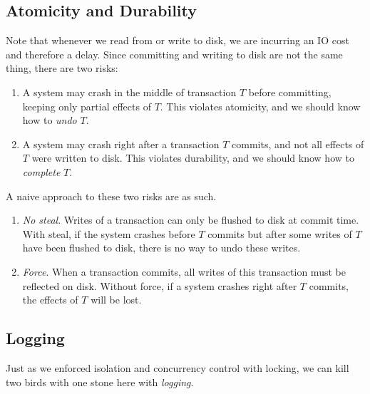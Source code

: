 \subsection{Atomicity and Durability} 

    Note that whenever we read from or write to disk, we are incurring an IO cost and therefore a delay. Since committing and writing to disk are not the same thing, there are two risks: 
    \begin{enumerate}
      \item A system may crash in the middle of transaction $T$ before committing, keeping only partial effects of $T$. This violates atomicity, and we should know how to \textit{undo} $T$. 
      \item A system may crash right after a transaction $T$ commits, and not all effects of $T$ were written to disk. This violates durability, and we should know how to \textit{complete} $T$. 
    \end{enumerate} 

    \begin{example}
      A naive approach to these two risks are as such.  
      \begin{enumerate}
        \item \textit{No steal}. Writes of a transaction can only be flushed to disk at commit time. With steal, if the system crashes before $T$ commits but after some writes of $T$ have been flushed to disk, there is no way to undo these writes. 
        \item \textit{Force}. When a transaction commits, all writes of this transaction must be reflected on disk. Without force, if a system crashes right after $T$ commits, the effects of $T$ will be lost. 
      \end{enumerate}
    \end{example}

  \subsection{Logging} 

    Just as we enforced isolation and concurrency control with locking, we can kill two birds with one stone here with \textit{logging}. 

